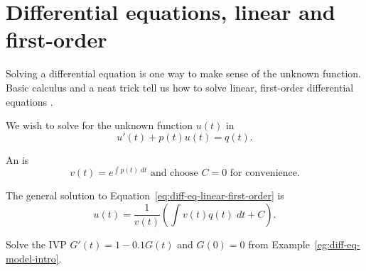 \documentclass[../main.tex]{subfiles}
\begin{document}
 \section{Differential equations, linear and first-order}

Solving a differential equation is one way to make sense of the unknown function. Basic calculus and a neat trick tell us how to solve linear, first-order differential equations .

\begin{thm} \label{thm:diff-eq-linear-first-order}
  We wish to solve for the unknown function \(u(t)\) in
  \begin{equation} \label{eq:diff-eq-linear-first-order}
    u'(t) + p(t) u(t) = q(t).
  \end{equation}
  
  An  is
  \begin{equation} \label{eq:diff-eq-integrating-factor}
    v(t) = e^{\int p(t) \;dt} \text{ and choose \(C = 0\) for convenience}.
  \end{equation} 

  The general solution to Equation~\eqref{eq:diff-eq-linear-first-order} is
  \begin{equation} \label{eq:diff-eq-linear-first-order-solution1}
    u(t) = \frac{1}{v(t)} \left( \int v(t) q(t) \;dt + C \right).
  \end{equation}
\end{thm}

\begin{example} \label{ex:linear-first-order-green-tube}
  Solve the IVP \(G'(t) = 1 - 0.1 G(t)\) and \(G(0) = 0\) from Example~\ref{eg:diff-eq-model-intro}.

\end{example}
\end{document}
